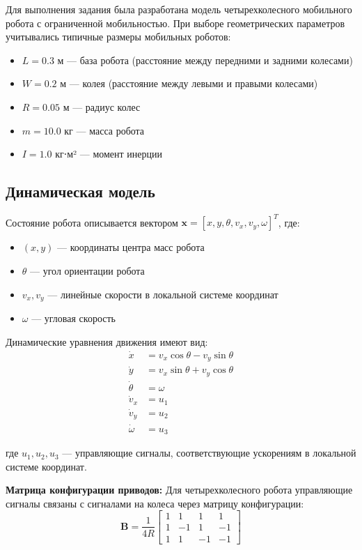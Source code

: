 Для выполнения задания была разработана модель четырехколесного мобильного робота с ограниченной мобильностью. При выборе геометрических параметров учитывались типичные размеры мобильных роботов:

\begin{itemize}
\item $L = 0.3$ м --- база робота (расстояние между передними и задними колесами)
\item $W = 0.2$ м --- колея (расстояние между левыми и правыми колесами)
\item $R = 0.05$ м --- радиус колес
\item $m = 10.0$ кг --- масса робота
\item $I = 1.0$ кг⋅м² --- момент инерции
\end{itemize}

\subsection{Динамическая модель}

Состояние робота описывается вектором $\mathbf{x} = [x, y, \theta, v_x, v_y, \omega]^T$, где:
\begin{itemize}
\item $(x, y)$ --- координаты центра масс робота
\item $\theta$ --- угол ориентации робота
\item $v_x, v_y$ --- линейные скорости в локальной системе координат
\item $\omega$ --- угловая скорость
\end{itemize}

Динамические уравнения движения имеют вид:
\begin{align}
\dot{x} &= v_x \cos\theta - v_y \sin\theta \\
\dot{y} &= v_x \sin\theta + v_y \cos\theta \\
\dot{\theta} &= \omega \\
\dot{v}_x &= u_1 \\
\dot{v}_y &= u_2 \\
\dot{\omega} &= u_3
\end{align}

где $u_1, u_2, u_3$ --- управляющие сигналы, соответствующие ускорениям в локальной системе координат.

\textbf{Матрица конфигурации приводов:} Для четырехколесного робота управляющие сигналы связаны с сигналами на колеса через матрицу конфигурации:
$$\mathbf{B} = \frac{1}{4R}\begin{bmatrix}
1 & 1 & 1 & 1 \\
1 & -1 & 1 & -1 \\
1 & 1 & -1 & -1
\end{bmatrix}$$

